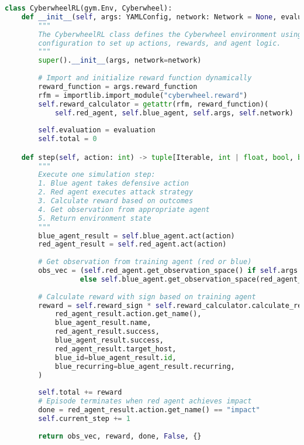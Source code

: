 \documentclass[12pt,a4paper]{article}
\begin{document}
\begin{lstlisting}[language=Python, caption=Core Environment Structure (Actual Implementation)]
class CyberwheelRL(gym.Env, Cyberwheel):
    def __init__(self, args: YAMLConfig, network: Network = None, evaluation: bool = False):
        """
        The CyberwheelRL class defines the Cyberwheel environment using YAML
        configuration to set up actions, rewards, and agent logic.
        """
        super().__init__(args, network=network)
        
        # Import and initialize reward function dynamically
        reward_function = args.reward_function
        rfm = importlib.import_module("cyberwheel.reward")
        self.reward_calculator = getattr(rfm, reward_function)(
            self.red_agent, self.blue_agent, self.args, self.network)
            
        self.evaluation = evaluation
        self.total = 0

    def step(self, action: int) -> tuple[Iterable, int | float, bool, bool, dict[str, Any]]:
        """
        Execute one simulation step:
        1. Blue agent takes defensive action
        2. Red agent executes attack strategy  
        3. Calculate reward based on outcomes
        4. Get observation from appropriate agent
        5. Return environment state
        """
        blue_agent_result = self.blue_agent.act(action)
        red_agent_result = self.red_agent.act(action)
        
        # Get observation from training agent (red or blue)
        obs_vec = (self.red_agent.get_observation_space() if self.args.train_red 
                  else self.blue_agent.get_observation_space(red_agent_result))
        
        # Calculate reward with sign based on training agent
        reward = self.reward_sign * self.reward_calculator.calculate_reward(
            red_agent_result.action.get_name(),
            blue_agent_result.name,
            red_agent_result.success,
            blue_agent_result.success,
            red_agent_result.target_host,
            blue_id=blue_agent_result.id,
            blue_recurring=blue_agent_result.recurring,
        )
        
        self.total += reward
        # Episode terminates when red agent achieves impact
        done = red_agent_result.action.get_name() == "impact"
        self.current_step += 1
        
        return obs_vec, reward, done, False, {}
\end{lstlisting}
\end{document}
